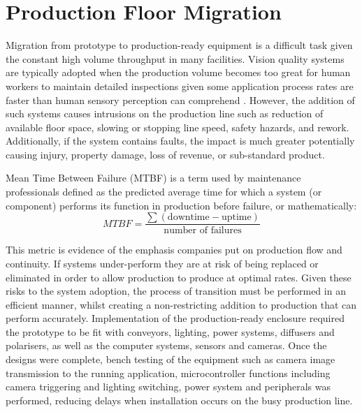 \documentclass[fleqn,twoside,12pt]{report}
\begin{document}
\section{Production Floor Migration}

Migration from prototype to production-ready equipment is a difficult task given the constant high volume throughput in many facilities. Vision quality systems are typically adopted when the production volume becomes too great for human workers to maintain detailed inspections given some application process rates are faster than human sensory perception can comprehend \cite{sofu, duan}. However, the addition of such systems causes intrusions on the production line such as reduction of available floor space, slowing or stopping line speed, safety hazards, and rework. Additionally, if the system contains faults, the impact is much greater potentially causing injury, property damage, loss of revenue, or sub-standard product.

Mean Time Between Failure (MTBF) is a term used by maintenance professionals defined as the predicted average time for which a system (or component) performs its function in production before failure, or mathematically:
\begin{equation}
	MTBF = \frac{\sum (\text{downtime} - \text{uptime})}{\text{number of failures}}
\end{equation}

This metric is evidence of the emphasis companies put on production flow and continuity. If systems under-perform they are at risk of being replaced or eliminated in order to allow production to produce at optimal rates. Given these risks to the system adoption, the process of transition must be performed in an efficient manner, whilst creating a non-restricting addition to production that can perform accurately. Implementation of the production-ready enclosure required the prototype to be fit with conveyors, lighting, power systems, diffusers and polarisers, as well as the computer systems, sensors and cameras. Once the designs were complete, bench testing of the equipment such as camera image transmission to the running application, microcontroller functions including camera triggering and lighting switching, power system and peripherals was performed, reducing delays when installation occurs on the busy production line.
\end{document}

